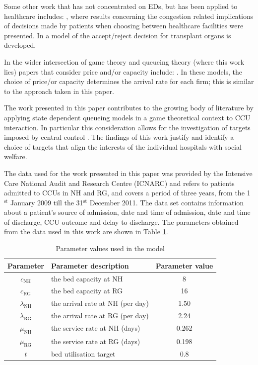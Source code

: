\documentclass{article}
\newcommand{\NH}{\text{NH}}
\newcommand{\RG}{\text{RG}}
\begin{document}
Some other work that has not concentrated on EDs, but has been applied to healthcare includes: \cite{Knight2013}, where results concerning the congestion related implications of decisions made by patients when choosing between healthcare facilities were presented. In \cite{Howard2002} a model of the accept/reject decision for transplant organs is developed.

In the wider intersection of game theory and queueing theory (where this work lies) papers that consider price and/or capacity include: \cite{Allon2007, Cachon2002,  Cachon2007, Kalai1992, Levhari1978}. In these models, the choice of price/or capacity determines the arrival rate for each firm; this is similar to the approach taken in this paper.

The work presented in this paper contributes to the growing body of literature by applying state dependent queueing models in a game theoretical context to CCU interaction.
In particular this consideration allows for the investigation of targets imposed by central control \cite{Bevan2006}.
The findings of this work justify and identify a choice of targets that align the interests of the individual hospitals with social welfare.

The data used for the work presented in this paper was provided by the Intensive Care National Audit and Research Centre (ICNARC) and refers to patients admitted to CCUs in NH and RG, and covers a period of three years, from the 1$^{\text{st}}$ January 2009 till the 31$^{\text{st}}$ December 2011.
The data set contains information about a patient's source of admission, date and time of admission, date and time of discharge, CCU outcome and delay to discharge.
The parameters obtained from the data used in this work are shown in Table \ref{parameter_values_model_1}.

\begin{table}[!htbp]
\begin{center}
\begin{tabular}{|c|l|c|}
\hline
\textbf{Parameter}&\textbf{Parameter description}&\textbf{Parameter value}\\
\hline
$c_{\NH}$&the bed capacity at NH&8\\
\hline
$c_{\RG}$&the bed capacity at RG&16\\
\hline
$\lambda_{\NH}$&the arrival rate at NH (per day)&1.50 \\
\hline
$\lambda_{\RG}$&the arrival rate at RG (per day)&2.24\\
\hline
$\mu_{\NH}$&the service rate at NH (days)&0.262\\
\hline
$\mu_{\RG}$&the service rate at RG (days)&0.198\\
\hline
$t$& bed utilisation target & 0.8\\
\hline
\end{tabular}
\end{center}
\caption{Parameter values used in the model}\label{parameter_values_model_1}
\end{table}
\end{document}
